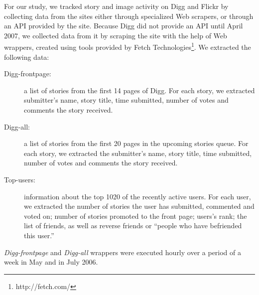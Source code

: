 \documentclass[]{article}
\begin{document}
For our study, we tracked story and image activity
on Digg and Flickr by collecting data from the sites either through
specialized Web scrapers, or through an API provided by the site.
Because Digg did not provide an API until April 2007, we collected data
from it by scraping the site
with the help of Web wrappers, created using
tools provided by Fetch Technologies\footnote{http://fetch.com/}. We
extracted the following data:

\begin{description}
  \item[Digg-frontpage:]  a list of stories
from the first 14 pages of Digg. For each story, we extracted
submitter's name, story title, time submitted, number of votes and
comments the story received.

  \item[Digg-all:]  a list of stories
from the first 20 pages in the upcoming stories queue. For each
story, we extracted the submitter's name, story title, time
submitted, number of votes and comments the story received.

  \item[Top-users:]  information about the top 1020 of
the recently active users.
  For each user, we extracted the number of stories
  the user has submitted, commented and voted on; number of stories
promoted to the front page; users's rank; the list of
  friends, as well as reverse friends or ``people who
  have befriended this user.''
\end{description}

\emph{Digg-frontpage} and \emph{Digg-all} wrappers were executed
hourly over a period of a week in May  and in July 2006.
\end{document}
